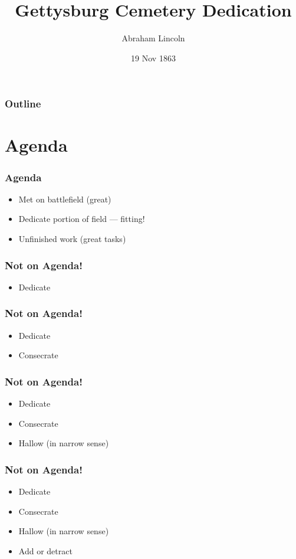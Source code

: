 \documentclass{beamer}
\title{Gettysburg Cemetery Dedication}
\author{Abraham Lincoln}
\institute{United States of America}
\date{19 Nov 1863}
\begin{document}
\begin{frame}
\titlepage
\end{frame}

\begin{frame}
\frametitle{Outline}
\tableofcontents
\end{frame}

\section{Agenda}

\begin{frame}
\frametitle{Agenda}
\begin{itemize}
\item Met on battlefield (great)
\item Dedicate portion of field --- fitting!
\item Unfinished work (great tasks)
\end{itemize}
\end{frame}

\begin{frame}
\frametitle{Not on Agenda!}
  \begin{itemize}
  \item Dedicate
  \end{itemize}
\end{frame}

\begin{frame}
\frametitle{Not on Agenda!}
  \begin{itemize}
  \item Dedicate
  \item Consecrate
  \end{itemize}
\end{frame}

\begin{frame}
\frametitle{Not on Agenda!}
  \begin{itemize}
  \item Dedicate
  \item Consecrate
  \item Hallow (in narrow sense)
  \end{itemize}
\end{frame}

\begin{frame}
\frametitle{Not on Agenda!}
  \begin{itemize}
  \item Dedicate
  \item Consecrate
  \item Hallow (in narrow sense)
  \item Add or detract
  \end{itemize}
\end{frame}
\end{document}
